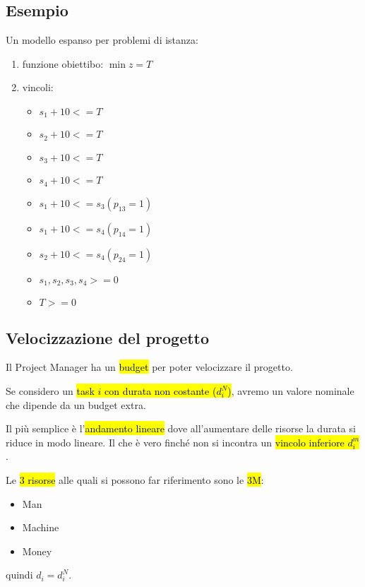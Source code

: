 \subsection{Esempio }

Un modello espanso per problemi di istanza:

\begin{enumerate}
	\item funzione obiettibo: $\min z = T$
	\item vincoli:
		\begin{itemize}
			\item $s_1 + 10 <= T$
			\item $s_2 + 10 <= T$
			\item $s_3 + 10 <= T$
			\item $s_4 + 10 <= T$
			\item $s_1 + 10 <= s_3 (p_{13} = 1)$
			\item $s_1 + 10 <= s_4 (p_{14} = 1)$
			\item $s_2 + 10 <= s_4 (p_{24} = 1)$
			\item $s_1, s_2, s_3, s_4 >= 0$
			\item $T >= 0$
		\end{itemize}
\end{enumerate}


\subsection{Velocizzazione del progetto}

Il Project Manager ha un \hl{budget} per poter velocizzare il progetto.

Se considero un \hl{task $i$ con durata non costante ($d_i^N$)}, avremo un valore nominale che dipende da un budget extra.

Il più semplice è l'\hl{andamento lineare} dove all'aumentare delle risorse la durata si riduce in modo lineare. Il che è vero finché non si incontra un \hl{vincolo inferiore $d_i^m$}.


Le \hl{3 risorse} alle quali si possono far riferimento sono le \hl{3M}:

\begin{itemize}
	\item Man
	\item Machine
	\item Money
\end{itemize}


quindi $d_i = d_i^N$.


